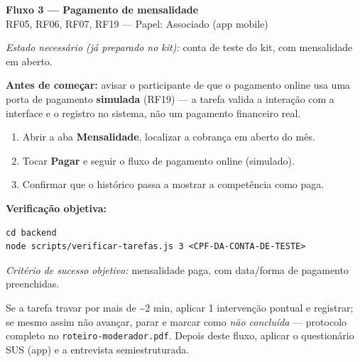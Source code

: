 \documentclass[11pt,a4paper]{article}
\newcommand{\criterio}[1]{\noindent\textit{Critério de sucesso objetivo:} #1}
\newcommand{\estado}[1]{\noindent\textit{Estado necessário (já preparado no kit):} #1\vspace{2mm}}
\begin{document}
\begin{center}
  {\LARGE\bfseries\color{brandgreen} Fluxo 3 --- Pagamento de mensalidade}\\[1mm]
  {\large RF05, RF06, RF07, RF19 --- Papel: Associado (app mobile)}
\end{center}

\vspace{2mm}
\estado{conta de teste do kit, com mensalidade em aberto.}

\noindent\colorbox{lightbg}{%
  \begin{minipage}{0.95\linewidth}
  \vspace{1mm}
  \textbf{Antes de começar:} avisar o participante de que o pagamento online usa uma porta de
  pagamento \textbf{simulada} (RF19) --- a tarefa valida a interação com a interface e o registro
  no sistema, não um pagamento financeiro real.
  \vspace{1mm}
  \end{minipage}%
}

\vspace{3mm}
\begin{enumerate}[leftmargin=6mm]
  \item Abrir a aba \textbf{Mensalidade}, localizar a cobrança em aberto do mês.
  \item Tocar \textbf{Pagar} e seguir o fluxo de pagamento online (simulado).
  \item Confirmar que o histórico passa a mostrar a competência como paga.
\end{enumerate}

\textbf{Verificação objetiva:}
\begin{verbatim}
cd backend
node scripts/verificar-tarefas.js 3 <CPF-DA-CONTA-DE-TESTE>
\end{verbatim}
\criterio{mensalidade paga, com data/forma de pagamento preenchidas.}

\vfill
\noindent\footnotesize Se a tarefa travar por mais de \textasciitilde2 min, aplicar 1 intervenção
pontual e registrar; se mesmo assim não avançar, parar e marcar como \textit{não concluída} ---
protocolo completo no \texttt{roteiro-moderador.pdf}. Depois deste fluxo, aplicar o questionário
SUS (app) e a entrevista semiestruturada.
\end{document}
